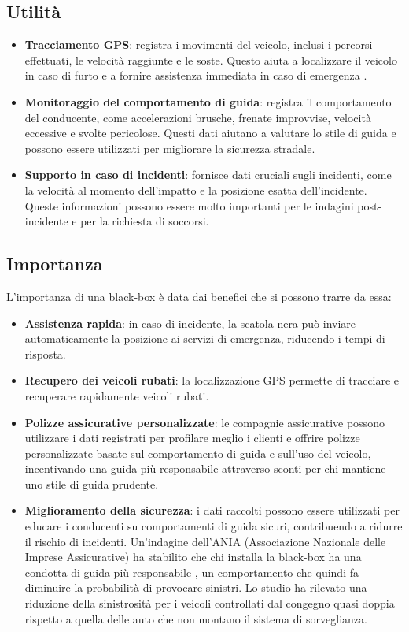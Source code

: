 \documentclass[12pt, a4paper, italian]{report}
\numberwithin{figure}{chapter}
\numberwithin{table}{chapter}
\begin{document}
\subsection{Utilità}
\begin{itemize}
    \item \textbf{Tracciamento GPS}: registra i movimenti del veicolo, inclusi i percorsi effettuati, le velocità raggiunte e le soste. Questo aiuta a localizzare il veicolo in caso di furto e a fornire assistenza immediata in caso di emergenza \cite{khin2018real}.
    \item \textbf{Monitoraggio del comportamento di guida}: registra il comportamento del conducente, come accelerazioni brusche, frenate improvvise, velocità eccessive e svolte pericolose. Questi dati aiutano a valutare lo stile di guida e possono essere utilizzati per migliorare la sicurezza stradale. \cite{hermawan2020acquisition}
    \item \textbf{Supporto in caso di incidenti}: fornisce dati cruciali sugli incidenti, come la velocità al momento dell'impatto e la posizione esatta dell'incidente. Queste informazioni possono essere molto importanti per le indagini post-incidente e per la richiesta di soccorsi. \cite{thompson2010using}
\end{itemize}
\subsection{Importanza}
L'importanza di una black-box è data dai benefici che si possono trarre da essa: 
\begin{itemize}
    \item \textbf{Assistenza rapida}: in caso di incidente, la scatola nera può inviare automaticamente la posizione ai servizi di emergenza, riducendo i tempi di risposta.
    \item \textbf{Recupero dei veicoli rubati}: la localizzazione GPS permette di tracciare e recuperare rapidamente veicoli rubati.
    \item \textbf{Polizze assicurative personalizzate}: le compagnie assicurative possono utilizzare i dati registrati per profilare meglio i clienti e offrire polizze personalizzate basate sul comportamento di guida e sull'uso del veicolo, incentivando una guida più responsabile attraverso sconti per chi mantiene uno stile di guida prudente.
    \item \textbf{Miglioramento della sicurezza}: i dati raccolti possono essere utilizzati per educare i conducenti su comportamenti di guida sicuri, contribuendo a ridurre il rischio di incidenti. Un'indagine dell'ANIA (Associazione Nazionale delle Imprese Assicurative) ha stabilito che chi installa la black-box ha una condotta di guida più responsabile \cite{diminuzioneIncidenti}, un comportamento che quindi fa diminuire la probabilità di provocare sinistri. Lo studio ha rilevato una riduzione della sinistrosità per i veicoli controllati dal congegno quasi doppia rispetto a quella delle auto che non montano il sistema di sorveglianza. 
\end{itemize}
\end{document}
